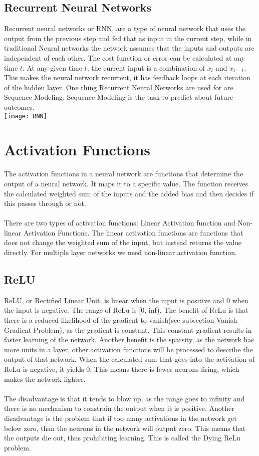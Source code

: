 \subsection{Recurrent Neural Networks}
Recurrent neural networks or RNN, are a type of neural network that uses the output from the previous step and fed that as input in the current step, while in traditional Neural networks the network assumes that the inputs and outputs are independent of each other. The cost function or error can be calculated at any time $t$. At any given time $t$, the current input is a combination of $x_t$ and $x_{t-1}$. This makes the neural network recurrent, it has feedback loops at each iteration of the hidden layer. One thing Recurrent Neural Networks are used for are Sequence Modeling. Sequence Modeling is the task to predict about future outcomes.\\

\texttt{[image: RNN]}

\section{Activation Functions}
The activation functions in a neural network are functions that determine the output of a neural network. It maps it to a specific value. The function receives the calculated weighted sum of the inputs and the added bias and then decides if this passes through or not. \\\\
There are two types of activation functions: Linear Activation function and Non-linear Activation Functions.
The linear activation functions are functions that does not change the weighted sum of the input, but instead returns the value directly. For multiple layer networks we need non-linear activation function.

\subsection{ReLU}
ReLU, or Rectified Linear Unit, is linear when the input is positive and 0 when the input is negative. The range of ReLu is [0, inf). The benefit of ReLu is that there is a reduced likelihood of the gradient to vanish(see subsection Vanish Gradient Problem), as the gradient is constant. This constant gradient results in faster learning of the network. Another benefit is the sparsity, as the network has more units in a layer, other activation functions will be processed to describe the output of that network. When the calculated sum that goes into the activation of ReLu is negative, it yields 0. This means there is fewer neurons firing, which makes the network lighter.\\\\
The disadvantage is that it tends to blow up, as the range goes to infinity and there is no mechanism to constrain the output when it is positive. Another disadvantage is the problem that if too many activations in the network get below zero, than the neurons in the network will output zero. This means that the outputs die out, thus prohibiting learning. This is called the Dying ReLu problem.

